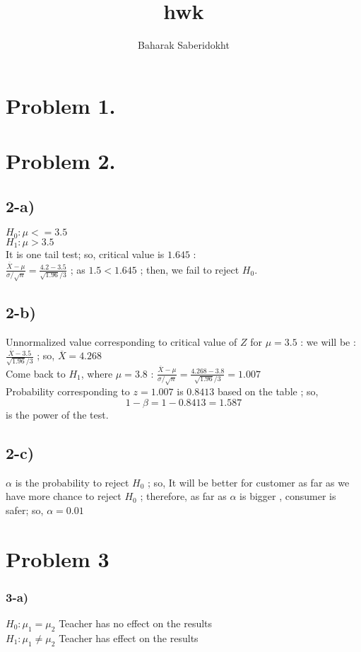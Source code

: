 \documentclass[10pt,a4paper]{article}
\author{Baharak Saberidokht}
\title{hwk}
\begin{document}
\maketitle



\section*{Problem 1.}


\section*{Problem 2.}
\subsection*{2-a)}
$H_{0} : \mu <= 3.5 $ \\
$H_{1} : \mu > 3.5 $ \\
It is one tail test; so, critical value is $1.645$ : \\
$\frac{\overline{X} - \mu}{\sigma /\sqrt n} = \frac{4.2 - 3.5}{\sqrt{1.96} / 3}$ ; as $1.5 < 1.645 $ ; then, we fail to reject $H_{0}$.

\subsection*{2-b) }
Unnormalized  value corresponding to critical value of $Z$ for $\mu = 3.5$ : we will be : $\frac{\overline{X} -3.5} {\sqrt{1.96}/3} $ ; so, $\overline{X} = 4.268	$\\
Come back to $H_{1}$, where $\mu = 3.8$ : $\frac{\overline{X} - \mu}{\sigma /\sqrt n} = \frac{4.268 - 3.8}{ \sqrt{1.96}/3} = 1.007$\\
Probability corresponding to $z = 1.007$ is $0.8413$ based on the table ; so, 
\[ 1-\beta = 1- 0.8413 = 1.587 \] is the power of the test.
\subsection*{2-c)}
$\alpha$ is the probability to reject $ H_{0}$ ; so, It will be better for customer as far as we have more chance to reject $H_{0}$ ; therefore,  as far as $\alpha$ is bigger , consumer is safer; so, 
$\alpha = 0.01$

\section*{Problem 3}

\subsubsection*{3-a)}
$H_{0} : \mu_{1} = \mu_{2}   $ Teacher has no effect on the results\\
$H_{1} : \mu_{1} \neq \mu_{2}  $ Teacher has effect on the results\\
\end{document}
